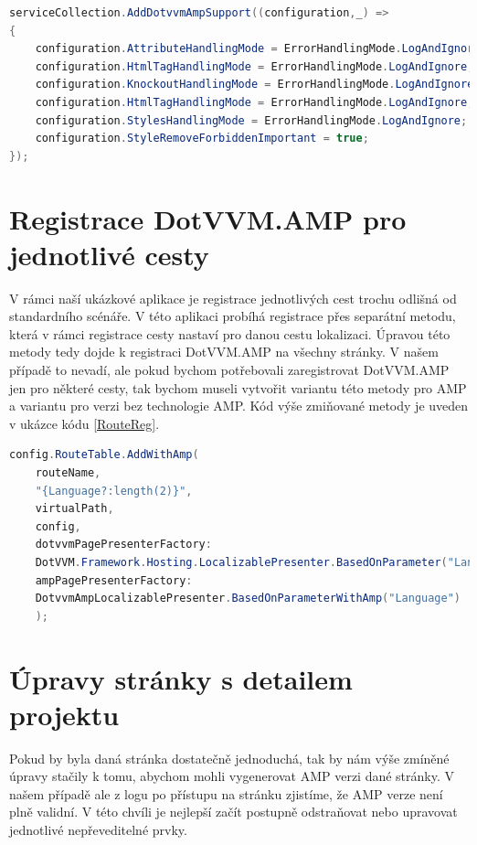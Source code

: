 \begin{lstlisting}[language=c#, caption=Ukázka možné AMP konfigurace,label=AmpConfig,captionpos=t]
serviceCollection.AddDotvvmAmpSupport((configuration,_) =>
{
	configuration.AttributeHandlingMode = ErrorHandlingMode.LogAndIgnore;
	configuration.HtmlTagHandlingMode = ErrorHandlingMode.LogAndIgnore;
	configuration.KnockoutHandlingMode = ErrorHandlingMode.LogAndIgnore;
	configuration.HtmlTagHandlingMode = ErrorHandlingMode.LogAndIgnore;
	configuration.StylesHandlingMode = ErrorHandlingMode.LogAndIgnore;
	configuration.StyleRemoveForbiddenImportant = true;
});
\end{lstlisting}

\section*{Registrace DotVVM.AMP pro jednotlivé cesty}
V rámci naší ukázkové aplikace je registrace jednotlivých cest trochu odlišná od standardního scénáře. V této aplikaci probíhá registrace přes separátní metodu, která v rámci registrace cesty nastaví pro danou cestu lokalizaci. Úpravou této metody tedy dojde k registraci DotVVM.AMP na všechny stránky. V našem případě to nevadí, ale pokud bychom potřebovali zaregistrovat DotVVM.AMP jen pro některé cesty, tak bychom museli vytvořit variantu této metody pro AMP a variantu pro verzi bez technologie AMP. Kód výše zmiňované metody je uveden v ukázce kódu \ref{RouteReg}. 
\begin{lstlisting}[language=c#, caption=Registrace cesty s DotVVM.AMP.,label=RouteReg,captionpos=t]
config.RouteTable.AddWithAmp(
	routeName,
	"{Language?:length(2)}",
	virtualPath,
	config,
	dotvvmPagePresenterFactory:
	DotVVM.Framework.Hosting.LocalizablePresenter.BasedOnParameter("Language"),
	ampPagePresenterFactory:
	DotvvmAmpLocalizablePresenter.BasedOnParameterWithAmp("Language")
	);

\end{lstlisting}

\section*{Úpravy stránky s detailem projektu}
Pokud by byla daná stránka dostatečně jednoduchá, tak by nám výše zmíněné úpravy stačily k tomu, abychom mohli vygenerovat AMP verzi dané stránky. V našem případě ale z logu po přístupu na stránku zjistíme, že AMP verze není plně validní. V této chvíli je nejlepší začít postupně odstraňovat nebo upravovat jednotlivé nepřeveditelné prvky.

